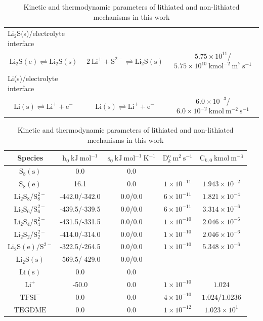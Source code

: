 \documentclass{elsarticle}
\begin{document}
\begin{table}[h!]
\begin{center}
\begin{tabular}{ ccc }
 \hline
 \multicolumn{1}{l}{Li$_2$S(s)/electrolyte interface} & &  \\
 $\mathrm{Li}_2\mathrm{S}(\mathrm{e}) \rightleftharpoons \mathrm{Li}_2\mathrm{S}(\mathrm{s})$ & $2 ~ \mathrm{Li}^+ + \mathrm{S}^{2-} \rightleftharpoons \mathrm{Li}_2\mathrm{S}(\mathrm{s})$ & $5.75 \times 10^{11}$/$5.75 \times 10^{10} ~ \mathrm{kmol}^{-2} ~ \mathrm{m}^{7} ~ \mathrm{s}^{-1}$  \\
 \hline
 \multicolumn{1}{l}{Li(s)/electrolyte interface} & &  \\
 $\mathrm{Li}(\mathrm{s}) \rightleftharpoons \mathrm{Li}^+ + \mathrm{e}^-$ & $\mathrm{Li}(\mathrm{s}) \rightleftharpoons \mathrm{Li}^+ + \mathrm{e}^-$ & $6.0 \times 10^{-3}$/$6.0 \times 10^{-2} ~ \mathrm{kmol} ~ \mathrm{m}^{-2} ~ \mathrm{s}^{-1}$  \\
 \hline\hline
 \end{tabular}
 \begin{tabular}{ccccc}
 Species & $\mathrm{h}_0 ~ \mathrm{kJ} ~ \mathrm{mol}^{-1}$ & $\mathrm{s}_0 ~ \mathrm{kJ} ~ \mathrm{mol}^{-1} ~ \mathrm{K}^{-1}$ & $\mathrm{D}^\mathrm{o}_k ~ \mathrm{m}^2 ~ \mathrm{s}^{-1}$ & $\mathrm{C}_{k,0} ~ \mathrm{kmol} ~ \mathrm{m}^{-3}$ \\
 \hline
 $\mathrm{S}_8(\mathrm{s})$ & 0.0 & 0.0 &  &  \\
 $\mathrm{S}_8(\mathrm{e})$ & 16.1 & 0.0 & $1 \times 10^{-11}$ & $1.943 \times 10^{-2}$ \\
 $\mathrm{Li}_2\mathrm{S}_8$/$\mathrm{S}_8^{2-}$ & -442.0/-342.0 & 0.0/0.0 & $6 \times 10^{-11}$ & $1.821 \times 10^{-4}$ \\
 $\mathrm{Li}_2\mathrm{S}_6$/$\mathrm{S}_6^{2-}$ & -439.5/-339.5 & 0.0/0.0 & $6 \times 10^{-11}$ & $3.314 \times 10^{-6}$ \\
 $\mathrm{Li}_2\mathrm{S}_4$/$\mathrm{S}_4^{2-}$ & -431.5/-331.5 & 0.0/0.0 & $1 \times 10^{-10}$ & $2.046 \times 10^{-6}$ \\
 $\mathrm{Li}_2\mathrm{S}_2$/$\mathrm{S}_2^{2-}$ & -414.0/-314.0 & 0.0/0.0 & $1 \times 10^{-10}$ & $2.046 \times 10^{-6}$ \\
 $\mathrm{Li}_2\mathrm{S}(\mathrm{e})$/$\mathrm{S}^{2-}$ & -322.5/-264.5 & 0.0/0.0 & $1 \times 10^{-10}$ & $5.348 \times 10^{-6}$ \\
 $\mathrm{Li}_2\mathrm{S}(\mathrm{s})$ & -569.5/-429.0 & 0.0/0.0 & &  \\
 $\mathrm{Li}(\mathrm{s})$ & 0.0 & 0.0 & &  \\
 $\mathrm{Li}^+$ & -50.0 & 0.0 & $1 \times 10^{-10}$ & $1.024$ \\
 $\mathrm{TFSI}^-$ & 0.0 & 0.0 & $4 \times 10^{-10}$ & $1.024$/$1.0236$ \\
 $\mathrm{TEGDME}$ & 0.0 & 0.0 & $1 \times 10^{-12}$ & $1.023 \times 10^{1}$ \\
 \hline\hline
\end{tabular}
\caption{Kinetic and thermodynamic parameters of lithiated and non-lithiated mechanisms in this work}
\label{cascadekineticsandthermo}
\end{center}
\end{table}
\end{document}
